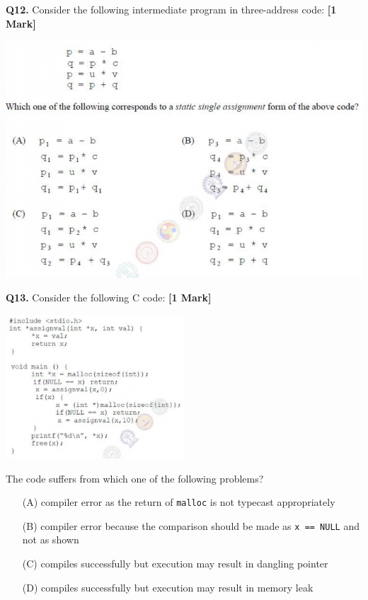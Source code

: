 \documentclass[11pt]{article}
\newcommand{\questiona}[2]{
    \noindent\textbf{Q#2.} #1 \hfill \textbf{[1 Mark]}
}
\begin{document}
\questiona{Consider the following intermediate program in three-address code:}{12}
\begin{center}
\includegraphics[width=1\textwidth]{figures/12.png}
\end{center}
\vspace{0.5cm}

\questiona{Consider the following C code:}{13}
\begin{center}
\includegraphics[width=0.5\textwidth]{figures/13.png}
\end{center}
The code suffers from which one of the following problems?  
\begin{enumerate}
    \item[(A)] compiler error as the return of \texttt{malloc} is not typecast appropriately  
    \item[(B)] compiler error because the comparison should be made as \texttt{x == NULL} and not as shown  
    \item[(C)] compiles successfully but execution may result in dangling pointer  
    \item[(D)] compiles successfully but execution may result in memory leak  
\end{enumerate}
\vspace{0.5cm}
\end{document}

